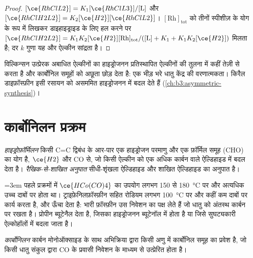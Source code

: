 \begin{proof}
$[\ce{RhClL2}] = K_1[\ce{RhClL3}]/[\mathrm L]$ और $[\ce{RhClH2L2}] = K_2[\ce{H2}][\ce{RhClL2}]$। $[\mathrm{Rh}]_{\mathrm{tot}}$ को
तीनों स्पीशीज़ के योग के रूप में लिखकर डाइहाइड्राइड के लिए हल करने पर $[\ce{RhClH2L2}] =
K_1K_2[\ce{H2}][\mathrm{Rh}]_{\mathrm{tot}}/([\mathrm L] + K_1 + K_1K_2[\ce{H2}])$ मिलता है; दर $k$ गुणा यह और ऐल्कीन
सांद्रता है।
\end{proof}

विल्किन्सन उत्प्रेरक अबाधित ऐल्कीनों का हाइड्रोजनन प्रतिस्थापित ऐल्कीनों की तुलना में कहीं
तेज़ी से करता है और कार्बोनिल समूहों को अछूता छोड़ देता है: एक
भीड़ भरे धातु केंद्र की वरणात्मकता। किरैल डाइफ़ॉस्फ़ीन इसी रसायन को
असममित हाइड्रोजनन में बदल देते हैं (\cref{ch:b3:asymmetric-synthesis})।

\section{कार्बोनिलन प्रक्रम}

\begin{definition}[हाइड्रोफ़ॉर्मिलन]\label{def:b3:homogeneous-catalysis:hydroformylation}
\emph{हाइड्रोफ़ॉर्मिलन} किसी C=C द्विबंध के आर-पार एक हाइड्रोजन परमाणु
और एक फ़ॉर्मिल समूह (CHO) का योग है, $\ce{H2}$ और CO से, जो किसी
ऐल्कीन को एक अधिक कार्बन वाले ऐल्डिहाइड में बदल देता है। \emph{रैखिक-से-शाखित
अनुपात} सीधी-शृंखला
ऐल्डिहाइड और शाखित ऐल्डिहाइड का अनुपात है।
\end{definition}

\emergencystretch=3em पहले प्रक्रमों में $\ce{HCo(CO)4}$ का उपयोग लगभग 150 से \qty{180}{\celsius} पर और अत्यधिक उच्च
दाबों पर होता था। ट्राइफ़ेनिलफ़ॉस्फ़ीन सहित रोडियम लगभग \qty{100}{\celsius} पर और
कहीं कम दाबों पर कार्य करता है, और ऊँचा  देता है: भारी
फ़ॉस्फ़ीन उस निवेशन का पक्ष लेते हैं जो धातु को अंतस्थ कार्बन पर रखता है।
प्रोपीन ब्यूटेनैल देता है, जिसका हाइड्रोजनन ब्यूटेनॉल में होता है या जिसे सुघट्यकारी
ऐल्कोहॉलों में बदला जाता है।

\begin{definition}[कार्बोनिलन]\label{def:b3:homogeneous-catalysis:carbonylation}
\emph{कार्बोनिलन} कार्बन मोनोऑक्साइड के साथ अभिक्रिया द्वारा किसी अणु में
कार्बोनिल समूह का प्रवेश है, जो किसी धातु संकुल द्वारा
CO के प्रवासी निवेशन के माध्यम से उत्प्रेरित होता है।
\end{definition}

